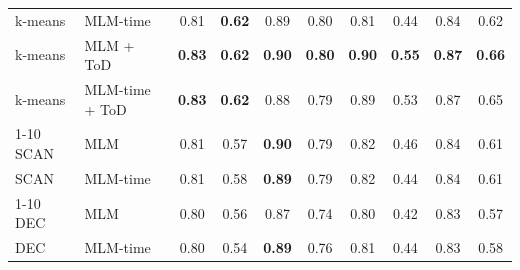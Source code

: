 \begin{table}[t]
\begin{tabular}{llcccccc|cc}
k-means & MLM-time & 0.81 & \textbf{0.62} & 0.89 & 0.80 & 0.81 & 0.44 & 0.84 & 0.62 \\
k-means & MLM + ToD & \textbf{0.83} & \textbf{0.62} & \textbf{0.90} & \textbf{0.80} & \textbf{0.90} & \textbf{0.55} & \textbf{0.87} & \textbf{0.66} \\
k-means & MLM-time + ToD & \textbf{0.83} & \textbf{0.62} & 0.88 & 0.79 & 0.89 & 0.53 & 0.87 & 0.65 \\
\cmidrule{1-10}
SCAN & MLM & 0.81 & 0.57 & \textbf{0.90} & 0.79 & 0.82 & 0.46 & 0.84 & 0.61 \\
SCAN & MLM-time & 0.81 & 0.58 & \textbf{0.89} & 0.79 & 0.82 & 0.44 & 0.84 & 0.61 \\
\cmidrule{1-10}
DEC & MLM & 0.80 & 0.56 & 0.87 & 0.74 & 0.80 & 0.42 & 0.83 & 0.57 \\
DEC & MLM-time & 0.80 & 0.54 & \textbf{0.89} & 0.76 & 0.81 & 0.44 & 0.83 & 0.58 \\
\bottomrule
\end{tabular}
\end{table}

